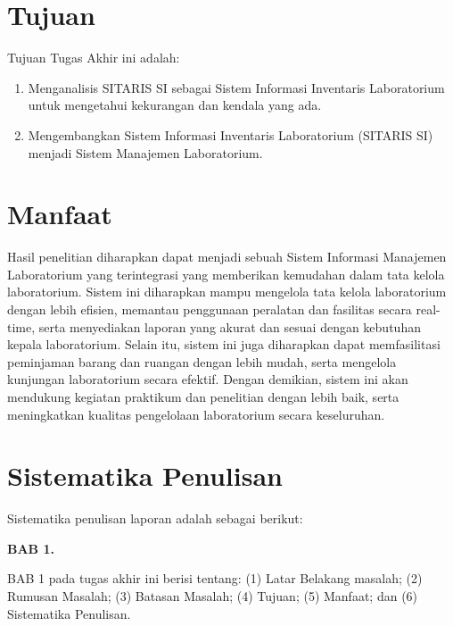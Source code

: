\section{Tujuan}
Tujuan Tugas Akhir ini adalah:
\begin{enumerate}
	\item Menganalisis SITARIS SI sebagai Sistem Informasi Inventaris Laboratorium untuk mengetahui kekurangan dan kendala yang ada.
	\item Mengembangkan Sistem Informasi Inventaris Laboratorium (SITARIS SI) menjadi Sistem Manajemen Laboratorium.
\end{enumerate}

\section{Manfaat}
Hasil penelitian diharapkan dapat menjadi sebuah Sistem Informasi Manajemen Laboratorium yang terintegrasi yang memberikan kemudahan dalam tata kelola laboratorium. Sistem ini diharapkan mampu mengelola tata kelola laboratorium dengan lebih efisien, memantau penggunaan peralatan dan fasilitas secara real-time, serta menyediakan laporan yang akurat dan sesuai dengan kebutuhan kepala laboratorium. Selain itu, sistem ini juga diharapkan dapat memfasilitasi peminjaman barang dan ruangan dengan lebih mudah, serta mengelola kunjungan laboratorium secara efektif. Dengan demikian, sistem ini akan mendukung kegiatan praktikum dan penelitian dengan lebih baik, serta meningkatkan kualitas pengelolaan laboratorium secara keseluruhan.
\section{Sistematika Penulisan}
Sistematika penulisan laporan adalah sebagai berikut:

\textbf{BAB 1. \babSatu}

BAB 1 pada tugas akhir ini berisi tentang: (1) Latar Belakang masalah; (2) Rumusan Masalah; (3) Batasan Masalah; (4) Tujuan; (5) Manfaat; dan (6) Sistematika Penulisan.

